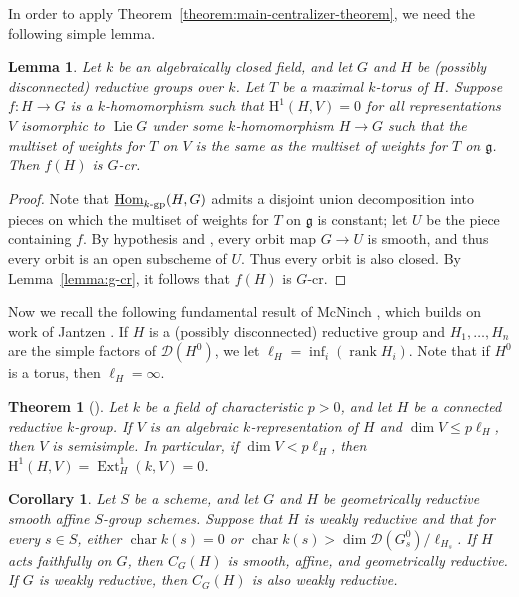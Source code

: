 \documentclass[11pt, letterpaper,english]{amsart}
\theoremstyle{plain}
\newtheorem{lemma}[lem]{Lemma}
\newtheorem{theorem}[lem]{Theorem}
\newtheorem{cor}[lem]{Corollary}
\theoremstyle{definition}
\numberwithin{equation}{section}
\numberwithin{lem}{section}
\newcommand{\fg}{\mathfrak{g}}
\newcommand{\sD}{{\mathscr D}}
\DeclareMathOperator{\Hom}{Hom}
\DeclareMathOperator{\rank}{rank}
\DeclareMathOperator{\Ext}{Ext}
\DeclareMathOperator{\chara} {char}
\DeclareMathOperator{\Lie}{Lie}
\begin{document}
In order to apply Theorem~\ref{theorem:main-centralizer-theorem}, we need the following simple lemma.

\begin{lemma}\label{lemma:cr-criterion}
    Let $k$ be an algebraically closed field, and let $G$ and $H$ be (possibly disconnected) reductive groups over $k$. Let $T$ be a maximal $k$-torus of $H$. Suppose $f: H \to G$ is a $k$-homomorphism such that $\mathrm{H}^1(H, V) = 0$ for all representations $V$ isomorphic to $\Lie G$ under some $k$-homomorphism $H \to G$ such that the multiset of weights for $T$ on $V$ is the same as the multiset of weights for $T$ on $\fg$. Then $f(H)$ is $G$-cr.
\end{lemma}

\begin{proof}
    Note that $\underline{\Hom}_{k\textrm{-}\rm{gp}}(H, G)$ admits a disjoint union decomposition into pieces on which the multiset of weights for $T$ on $\fg$ is constant; let $U$ be the piece containing $f$. By hypothesis and \cite[Exp.\ III, Corollaire 2.8]{sga3}, every orbit map $G \to U$ is smooth, and thus every orbit is an open subscheme of $U$. Thus every orbit is also closed. By Lemma~\ref{lemma:g-cr}, it follows that $f(H)$ is $G$-cr.
\end{proof}

Now we recall the following fundamental result of McNinch \cite{McNinch-semisimple}, which builds on work of Jantzen \cite{Jantzen-semisimple}. If $H$ is a (possibly disconnected) reductive group and $H_1, \dots, H_n$ are the simple factors of $\sD(H^0)$, we let $\ell_H = \inf_i(\rank H_i)$. Note that if $H^0$ is a torus, then $\ell_H = \infty$.

\begin{theorem}[{\hspace{1pt}\cite[Corollary 1.1.2]{McNinch-semisimple}}] \label{theorem:jantzen-semisimple}
    Let $k$ be a field of characteristic $p > 0$, and let $H$ be a connected reductive $k$-group. If $V$ is an algebraic $k$-representation of $H$ and $\dim V \leq p\ell_H$, then $V$ is semisimple. In particular, if $\dim V < p\ell_H$, then $\mathrm{H}^1(H, V) = \Ext_H^1(k, V) = 0$.
\end{theorem}

\begin{cor}\label{corollary:centralizer-of-weakly-reductive}
    Let $S$ be a scheme, and let $G$ and $H$ be geometrically reductive smooth affine $S$-group schemes. Suppose that $H$ is weakly reductive and that for every $s \in S$, either $\chara k(s) = 0$ or $\chara k(s) > \dim \sD(G^0_s)/\ell_{H_s}$. If $H$ acts faithfully on $G$, then $C_G(H)$ is smooth, affine, and geometrically reductive. If $G$ is weakly reductive, then $C_G(H)$ is also weakly reductive.
\end{cor}
\end{document}
